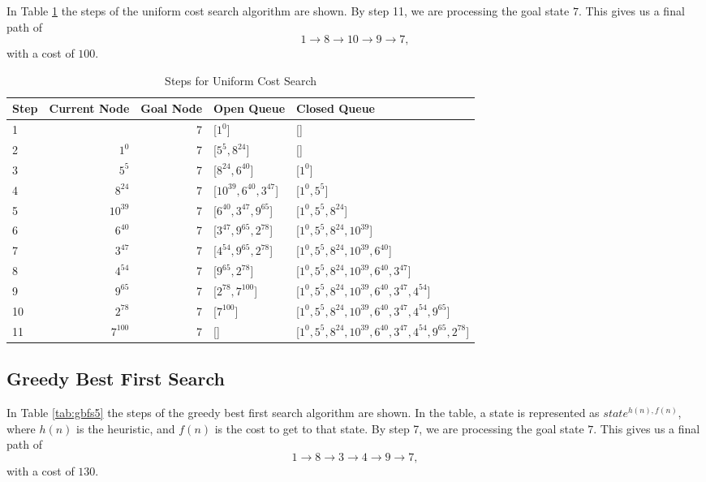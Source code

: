 \documentclass{article}
\begin{document}
    In Table \ref{tab:ucs5} the steps of the uniform cost search algorithm are shown. 
    By step 11, we are processing the goal state $7$. This gives us a final path of
    \begin{equation}
        1 \rightarrow 8 \rightarrow 10 \rightarrow 9 \rightarrow 7,
    \end{equation}
    with a cost of $100$.

    \begin{table}[!htp]\centering
        \caption{Steps for Uniform Cost Search}\label{tab:ucs5}
        \scriptsize
        \begin{tabular}{lrrll}\toprule
        Step &Current Node &Goal Node & Open Queue &Closed Queue  \\\midrule
        1&  &7 &[$1^{0}$] &[] \\
        2& $1^{0}$ &7 &[$5^{5}, 8^{24}$] &[] \\
        3& $5^{5}$ &7 &[$8^{24}, 6^{40}$] &[$1^{0}$] \\
        4& $8^{24}$ &7 &[$10^{39}, 6^{40}, 3^{47} $] &[$1^{0}, 5^{5}$] \\
        5& $10^{39}$ &7 &[$6^{40}, 3^{47}, 9^{65} $] &[$1^{0}, 5^{5}, 8^{24}$] \\
        6& $6^{40}$ &7 &[$3^{47}, 9^{65}, 2^{78}$] &[$1^{0}, 5^{5}, 8^{24}, 10^{39}$] \\
        7& $3^{47}$ &7 &[$4^{54}, 9^{65}, 2^{78}$] &[$1^{0}, 5^{5}, 8^{24}, 10^{39}, 6^{40}$] \\
        8& $4^{54}$ &7 &[$9^{65}, 2^{78}$] &[$1^{0}, 5^{5}, 8^{24}, 10^{39}, 6^{40}, 3^{47}$] \\
        9& $9^{65}$ &7 &[$2^{78}, 7^{100}$] &[$1^{0}, 5^{5}, 8^{24}, 10^{39}, 6^{40}, 3^{47}, 4^{54}$] \\
        10& $2^{78}$ &7 &[$7^{100}$] &[$1^{0}, 5^{5}, 8^{24}, 10^{39}, 6^{40}, 3^{47}, 4^{54}, 9^{65}$] \\
        11& $7^{100}$ &7 &[] &[$1^{0}, 5^{5}, 8^{24}, 10^{39}, 6^{40}, 3^{47}, 4^{54}, 9^{65}, 2^{78}$] \\
        \end{tabular}
    \end{table}

\subsection{Greedy Best First Search}


    In Table \ref{tab:gbfs5} the steps of the greedy best first search algorithm are shown. In the table, a state is represented as $state^{h(n), f(n)}$, where $h(n)$ is the heuristic, and $f(n)$ is the cost to get to that state.
    By step 7, we are processing the goal state $7$. This gives us a final path of
    \begin{equation}
        1 \rightarrow 8 \rightarrow 3 \rightarrow 4 \rightarrow 9 \rightarrow 7,
    \end{equation}
    with a cost of $130$.
\end{document}
